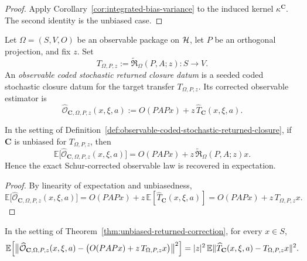 \begin{proof}
Apply Corollary~\ref{cor:integrated-bias-variance} to the induced kernel
\(\kappa^{\mathbf C}\). The second identity is the unbiased case.
\end{proof}

\begin{definition}
\label{def:observable-coded-stochastic-returned-closure}
Let \(\Omega=(S,V,O)\) be an observable package on \(\mathcal{H}\), let \(P\) be an
orthogonal projection, and fix \(z\). Set
\[
T_{\Omega,P,z}:=
\widetilde{\mathfrak R}_{\Omega}(P,A;z):S\to V.
\]
An \emph{observable coded stochastic returned closure datum} is a seeded coded
stochastic closure datum for the target transfer \(T_{\Omega,P,z}\). Its
corrected observable estimator is
\[
\widehat{\mathcal O}_{\mathbf C,\Omega,P,z}(x,\xi,a)
:=
O(PAPx)+z\,\widehat T_{\mathbf C}(x,\xi,a).
\]
\end{definition}

\begin{theorem}
\label{thm:unbiased-returned-correction}
In the setting of
Definition~\ref{def:observable-coded-stochastic-returned-closure}, if
\(\mathbf C\) is unbiased for \(T_{\Omega,P,z}\), then
\[
\mathbb E\bigl[
\widehat{\mathcal O}_{\mathbf C,\Omega,P,z}(x,\xi,a)
\bigr]
=
O(PAPx)+z\,\widetilde{\mathfrak R}_{\Omega}(P,A;z)x.
\]
Hence the exact Schur-corrected observable law is recovered in expectation.
\end{theorem}

\begin{proof}
By linearity of expectation and unbiasedness,
\[
\mathbb E\bigl[
\widehat{\mathcal O}_{\mathbf C,\Omega,P,z}(x,\xi,a)
\bigr]
=
O(PAPx)+z\,\mathbb E[\widehat T_{\mathbf C}(x,\xi,a)]
=
O(PAPx)+z\,T_{\Omega,P,z}x.
\]
\end{proof}

\begin{corollary}
\label{cor:observable-mean-square-error}
In the setting of Theorem~\ref{thm:unbiased-returned-correction}, for every
\(x\in S\),
\[
\mathbb E\Bigl[
\bigl\|
\widehat{\mathcal O}_{\mathbf C,\Omega,P,z}(x,\xi,a)
-
\bigl(O(PAPx)+z\,T_{\Omega,P,z}x\bigr)
\bigr\|^2
\Bigr]
=
|z|^2\,\mathbb E\|\widehat T_{\mathbf C}(x,\xi,a)-T_{\Omega,P,z}x\|^2.
\]
\end{corollary}

